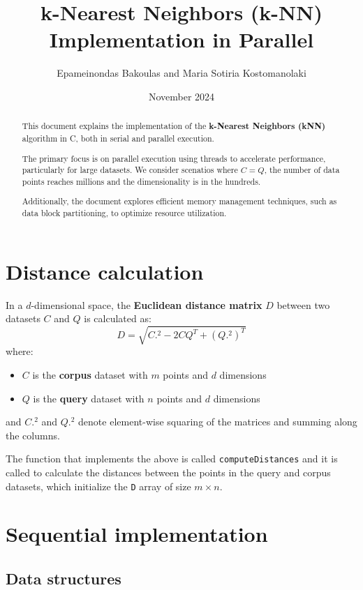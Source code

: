 \documentclass{article}
\title{k-Nearest Neighbors (k-NN) Implementation in Parallel}
\author{Epameinondas Bakoulas and Maria Sotiria Kostomanolaki}
\date{November 2024}
\begin{document}
\maketitle

\begin{abstract}
    This document explains the implementation of the \textbf{k-Nearest Neighbors (kNN)} algorithm in C, both in serial and parallel execution.
    
    The primary focus is on parallel execution using threads to accelerate performance, particularly for large datasets. We consider scenatios 
    where $C=Q$, the number of data points reaches millions and the dimensionality is in the hundreds. 

    Additionally, the document explores efficient memory management techniques, such as data block partitioning, to optimize resource utilization.
\end{abstract}

\section{Distance calculation}
In a $d$-dimensional space, the \textbf{Euclidean distance matrix} $D$ between two datasets 
$C$ and $Q$ is calculated as: 
\[
D = \sqrt{C.^2 - 2 C Q^T + (Q.^2)^T}
\]
where:
\begin{itemize}
    \item $C$ is the \textbf{corpus} dataset with $m$ points and $d$ dimensions
    \item $Q$ is the \textbf{query} dataset with $n$ points and $d$ dimensions
\end{itemize}
and $C.^2$ and $Q.^2$ denote element-wise squaring of the matrices and summing along the columns.

The function that implements the above is called \texttt{computeDistances} and it is called to calculate the
distances between the points in the query and corpus datasets, which initialize the \texttt{D} array of size $m \times n$.


\section{Sequential implementation}

\subsection{Data structures} 
\end{document}
